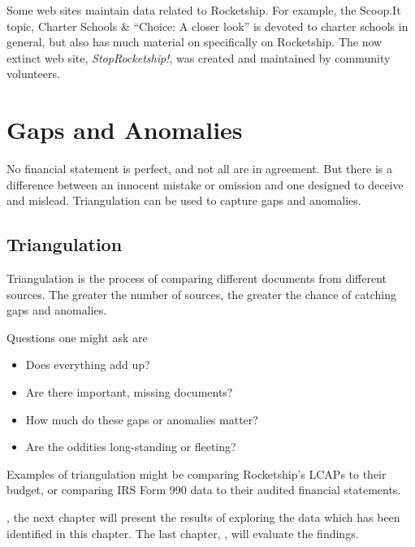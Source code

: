 Some web sites maintain data related to Rocketship. For example, the Scoop.It topic, Charter Schools \& ``Choice: A closer look'' \textcite{Marachi2016} is devoted to charter schools in general, but also has much material on specifically on Rocketship. The now extinct web site, \textit{StopRocketship!}, was created and maintained by community volunteers. 

\section{Gaps and Anomalies}\label{sec:gaps-anomalies}\indent

No financial statement is perfect, and not all are in agreement. But there is a difference between an innocent mistake or omission and one designed to deceive and mislead. Triangulation can be used to capture gaps and anomalies.

\subsection{Triangulation}\label{sec:triangulation}\indent

Triangulation is the process of comparing different documents from different sources. The greater the number of sources, the greater the chance of catching gaps and anomalies.

Questions one might ask are
\begin{itemize}
  \item Does everything add up? 
  \item Are there important, missing documents? 
  \item How much do these gaps or anomalies matter? 
  \item Are the oddities long-standing or fleeting? 
\end{itemize}
Examples of triangulation might be comparing Rocketship's LCAPs to their budget, or comparing IRS Form 990 data to their audited financial statements.

, the next chapter will present the results of exploring the data which has been identified in this chapter. The last chapter, , will evaluate the findings.

